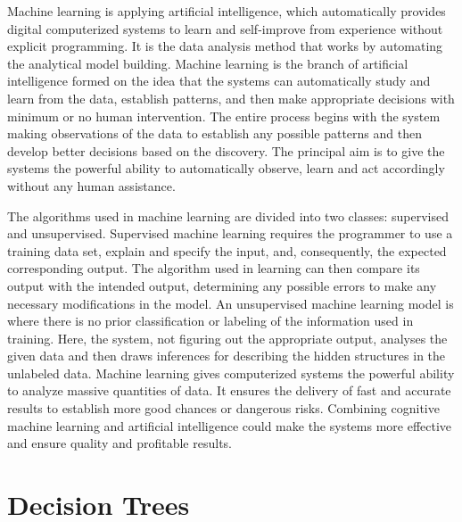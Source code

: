\documentclass[10pt,conference,a4paper]{IEEEtran}
\begin{document}
Machine learning is applying artificial intelligence, which automatically provides digital computerized systems to learn and self-improve from experience without explicit programming. It is the data analysis method that works by automating the analytical model building. Machine learning is the branch of artificial intelligence formed on the idea that the systems can automatically study and learn from the data, establish patterns, and then make appropriate decisions with minimum or no human intervention\cite{burkov2020}. The entire process begins with the system making observations of the data to establish any possible patterns and then develop better decisions based on the discovery. The principal aim is to give the systems the powerful ability to automatically observe, learn and act accordingly without any human assistance. \par
The algorithms used in machine learning are divided into two classes: supervised and unsupervised. Supervised machine learning requires the programmer to use a training data set, explain and specify the input, and, consequently, the expected corresponding output. The algorithm used in learning can then compare its output with the intended output, determining any possible errors to make any necessary modifications in the model\cite{geron2019}. An unsupervised machine learning model is where there is no prior classification or labeling of the information used in training. Here, the system, not figuring out the appropriate output, analyses the given data and then draws inferences for describing the hidden structures in the unlabeled data\cite{moroney2020}. Machine learning gives computerized systems the powerful ability to analyze massive quantities of data. It ensures the delivery of fast and accurate results to establish more good chances or dangerous risks. Combining cognitive machine learning and artificial intelligence could make the systems more effective and ensure quality and profitable results.

\section{Decision Trees}
\end{document}

